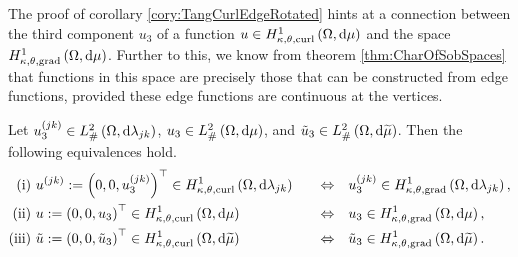 The proof of corollary \ref{cory:TangCurlEdgeRotated} hints at a connection between the third component $u_3$ of a function $u\in H^1_{\kappa,\theta,\mathrm{curl}}\left( \Omega, \mathrm{d}\mu \right)$ and the space $H^1_{\kappa,\theta,\mathrm{grad}}\left( \Omega, \mathrm{d}\mu \right)$.
Further to this, we know from theorem \ref{thm:CharOfSobSpaces} that functions in this space are precisely those that can be constructed from edge functions, provided these edge functions are continuous at the vertices.
\begin{prop} \label{prop:TC-3rdComponentIFF}
	Let $u_3^{(jk)}\in L^2_{\#}\left( \Omega,\mathrm{d} \lambda_{jk} \right)$, $u_3\in L^2_{\#}\left( \Omega,\mathrm{d} \mu \right)$, and $\tilde{u}_3\in L^2_{\#}\left( \Omega,\mathrm{d} \widetilde{\mu} \right)$.
	Then the following equivalences hold.
	\begin{align*}
		\mathrm{(i)} \ &
		u^{(jk)}:= \left( 0,0,u_3^{(jk)} \right)^\top\in H^1_{\kappa,\theta,\mathrm{curl}}\left( \Omega, \mathrm{d}\lambda_{jk} \right)
		\quad &\Leftrightarrow &\quad
		u_3^{(jk)}\in H^1_{\kappa,\theta,\mathrm{grad}}\left( \Omega, \mathrm{d}\lambda_{jk} \right), \\
		\mathrm{(ii)} \ &
		u:= \left( 0,0,u_3 \right)^\top\in H^1_{\kappa,\theta,\mathrm{curl}}\left( \Omega, \mathrm{d}\mu \right)
		\quad &\Leftrightarrow &\quad
		u_3\in H^1_{\kappa,\theta,\mathrm{grad}}\left( \Omega, \mathrm{d}\mu \right), \\
		\mathrm{(iii)} \ &
		\tilde{u} := \left( 0,0,\tilde{u}_3 \right)^\top\in H^1_{\kappa,\theta,\mathrm{curl}}\left( \Omega, \mathrm{d}\widetilde{\mu} \right)
		\quad &\Leftrightarrow &\quad
		\tilde{u}_3\in H^1_{\kappa,\theta,\mathrm{grad}}\left( \Omega, \mathrm{d}\widetilde{\mu} \right).
	\end{align*}
\end{prop}
